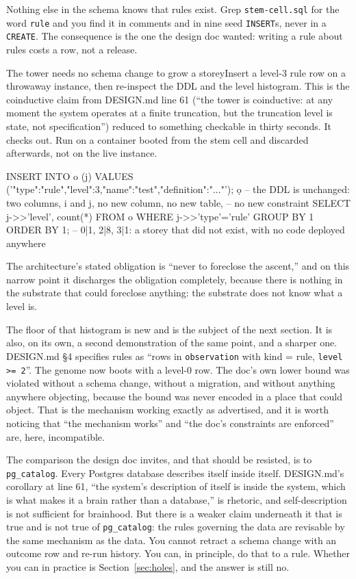 Nothing else in the schema knows that rules exist. Grep \texttt{stem-cell.sql} for the word \texttt{rule} and you find it in comments and in nine seed \texttt{INSERT}s, never in a \texttt{CREATE}. The consequence is the one the design doc wanted: writing a rule about rules costs a row, not a release.

\begin{Correspondence}{The tower needs no schema change to grow a storey}{Insert a level-3 rule row on a throwaway instance, then re-inspect the DDL and the level histogram.}
This is the coinductive claim from DESIGN.md line 61 (``the tower is coinductive: at any moment the system operates at a finite truncation, but the truncation level is state, not specification'') reduced to something checkable in thirty seconds. It checks out. Run on a container booted from the stem cell and discarded afterwards, not on the live instance.
\begin{Check}
INSERT INTO o (j) VALUES ('{"type":"rule","level":3,"name":"test","definition":"..."}');
\d o
-- the DDL is unchanged: two columns, i and j, no new column, no new table,
-- no new constraint
SELECT j->>'level', count(*) FROM o WHERE j->>'type'='rule' GROUP BY 1 ORDER BY 1;
-- 0|1, 2|8, 3|1: a storey that did not exist, with no code deployed anywhere
\end{Check}
The architecture's stated obligation is ``never to foreclose the ascent,'' and on this narrow point it discharges the obligation completely, because there is nothing in the substrate that could foreclose anything: the substrate does not know what a level is.
\end{Correspondence}

The floor of that histogram is new and is the subject of the next section. It is also, on its own, a second demonstration of the same point, and a sharper one. DESIGN.md \S4 specifies rules as ``rows in \texttt{observation} with kind = rule, \texttt{level >= 2}''. The genome now boots with a level-0 row. The doc's own lower bound was violated without a schema change, without a migration, and without anything anywhere objecting, because the bound was never encoded in a place that could object. That is the mechanism working exactly as advertised, and it is worth noticing that ``the mechanism works'' and ``the doc's constraints are enforced'' are, here, incompatible.

The comparison the design doc invites, and that should be resisted, is to \texttt{pg\_catalog}. Every Postgres database describes itself inside itself. DESIGN.md's corollary at line 61, ``the system's description of itself is inside the system, which is what makes it a brain rather than a database,'' is rhetoric, and self-description is not sufficient for brainhood. But there is a weaker claim underneath it that is true and is not true of \texttt{pg\_catalog}: the rules governing the data are revisable by the same mechanism as the data. You cannot retract a schema change with an outcome row and re-run history. You can, in principle, do that to a rule. Whether you can in practice is Section~\ref{sec:holes}, and the answer is still no.

